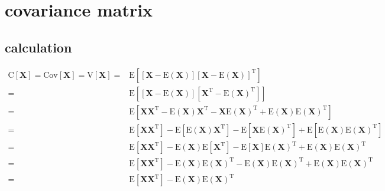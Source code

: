 \documentclass[
]{book}
\theoremstyle{definition}
\theoremstyle{definition}
\theoremstyle{definition}
\theoremstyle{definition}
\theoremstyle{remark}
\begin{document}
\section{covariance matrix}\label{covariance-matrix-1}

\textsuperscript{}

\subsection{calculation}\label{calculation}

\begin{align*}
\mathrm{C}\left[\boldsymbol{X}\right]=\mathrm{Cov}\left[\boldsymbol{X}\right]=\mathrm{V}\left[\boldsymbol{X}\right]= & \mathrm{E}\left[\left[\boldsymbol{X}-\mathrm{E}\left(\boldsymbol{X}\right)\right]\left[\boldsymbol{X}-\mathrm{E}\left(\boldsymbol{X}\right)\right]^{\mathrm{T}}\right]\\
= & \mathrm{E}\left[\left[\boldsymbol{X}-\mathrm{E}\left(\boldsymbol{X}\right)\right]\left[\boldsymbol{X}^{\mathrm{T}}-\mathrm{E}\left(\boldsymbol{X}\right)^{\mathrm{T}}\right]\right]\\
= & \mathrm{E}\left[\boldsymbol{X}\boldsymbol{X}^{\mathrm{T}}-\mathrm{E}\left(\boldsymbol{X}\right)\boldsymbol{X}^{\mathrm{T}}-\boldsymbol{X}\mathrm{E}\left(\boldsymbol{X}\right)^{\mathrm{T}}+\mathrm{E}\left(\boldsymbol{X}\right)\mathrm{E}\left(\boldsymbol{X}\right)^{\mathrm{T}}\right]\\
= & \mathrm{E}\left[\boldsymbol{X}\boldsymbol{X}^{\mathrm{T}}\right]-\mathrm{E}\left[\mathrm{E}\left(\boldsymbol{X}\right)\boldsymbol{X}^{\mathrm{T}}\right]-\mathrm{E}\left[\boldsymbol{X}\mathrm{E}\left(\boldsymbol{X}\right)^{\mathrm{T}}\right]+\mathrm{E}\left[\mathrm{E}\left(\boldsymbol{X}\right)\mathrm{E}\left(\boldsymbol{X}\right)^{\mathrm{T}}\right]\\
= & \mathrm{E}\left[\boldsymbol{X}\boldsymbol{X}^{\mathrm{T}}\right]-\mathrm{E}\left(\boldsymbol{X}\right)\mathrm{E}\left[\boldsymbol{X}^{\mathrm{T}}\right]-\mathrm{E}\left[\boldsymbol{X}\right]\mathrm{E}\left(\boldsymbol{X}\right)^{\mathrm{T}}+\mathrm{E}\left(\boldsymbol{X}\right)\mathrm{E}\left(\boldsymbol{X}\right)^{\mathrm{T}}\\
= & \mathrm{E}\left[\boldsymbol{X}\boldsymbol{X}^{\mathrm{T}}\right]-\mathrm{E}\left(\boldsymbol{X}\right)\mathrm{E}\left(\boldsymbol{X}\right)^{\mathrm{T}}-\mathrm{E}\left(\boldsymbol{X}\right)\mathrm{E}\left(\boldsymbol{X}\right)^{\mathrm{T}}+\mathrm{E}\left(\boldsymbol{X}\right)\mathrm{E}\left(\boldsymbol{X}\right)^{\mathrm{T}}\\
= & \mathrm{E}\left[\boldsymbol{X}\boldsymbol{X}^{\mathrm{T}}\right]-\mathrm{E}\left(\boldsymbol{X}\right)\mathrm{E}\left(\boldsymbol{X}\right)^{\mathrm{T}}
\end{align*}
\end{document}
